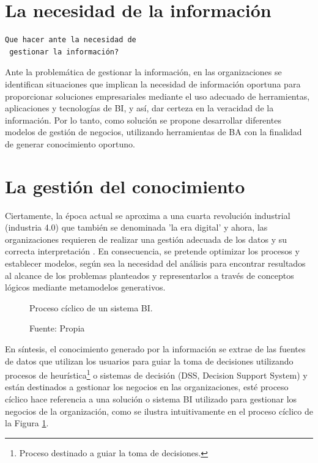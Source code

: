 \documentclass[12pt,jou]{apa7}
\begin{document}
\section{La necesidad de la información}

\begin{verbatim}
Que hacer ante la necesidad de
 gestionar la información?
\end{verbatim}

Ante la problemática de gestionar la información, en las organizaciones se identifican situaciones que implican la necesidad de información oportuna para proporcionar soluciones empresariales mediante el uso adecuado de herramientas, aplicaciones y tecnologías de BI, y así, dar certeza en la veracidad de la información. Por lo tanto, como solución se propone desarrollar diferentes modelos de gestión de negocios, utilizando herramientas de BA con la finalidad de generar conocimiento oportuno.

\section{La gestión del conocimiento}

Ciertamente, la época actual se aproxima a una cuarta revolución industrial (industria 4.0) que también se denominada 'la era digital' y ahora, las organizaciones requieren de realizar una gestión adecuada de los datos y su correcta interpretación \cite{MartJ}. En consecuencia, se pretende optimizar los procesos y establecer modelos, según sea la necesidad del análisis para encontrar resultados al alcance de los problemas planteados y representarlos a través de conceptos lógicos mediante metamodelos generativos.


\begin{figure}[h]
\caption{Proceso cíclico de un sistema BI.} \label{fig: DSS}
\caption*{Fuente: Propia}
\end{figure}

En síntesis, el conocimiento generado por la información se extrae de las fuentes de datos que utilizan los usuarios para guiar la toma de decisiones utilizando procesos de heurística\footnote{Proceso destinado a guiar la toma de decisiones.} o sistemas de decisión (DSS, Decision Support System) y están destinados a gestionar los negocios en las organizaciones, esté proceso cíclico hace referencia a una solución o sistema BI utilizado para gestionar los negocios de la organización, como se ilustra intuitivamente en el proceso cíclico de la Figura \ref{fig: DSS}.
\end{document}
